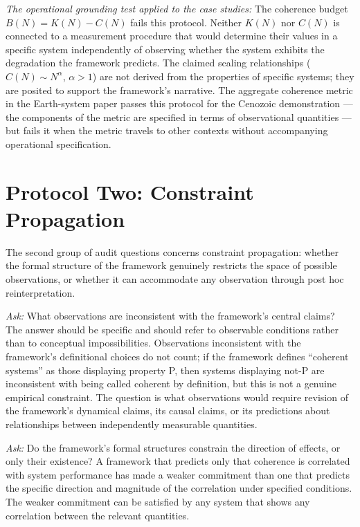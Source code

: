 \documentclass[12pt, openright, twoside]{book}
\begin{document}
\textit{The operational grounding test applied to the case studies:}
The coherence budget $B(N) = K(N) - C(N)$ fails this protocol. Neither
$K(N)$ nor $C(N)$ is connected to a measurement procedure that would
determine their values in a specific system independently of observing
whether the system exhibits the degradation the framework predicts. The
claimed scaling relationships ($C(N) \sim N^\alpha$, $\alpha > 1$) are
not derived from the properties of specific systems; they are posited to
support the framework's narrative. The aggregate coherence metric in
the Earth-system paper passes this protocol for the Cenozoic demonstration
--- the components of the metric are specified in terms of observational
quantities --- but fails it when the metric travels to other contexts
without accompanying operational specification.

\section{Protocol Two: Constraint Propagation}

The second group of audit questions concerns constraint propagation: whether
the formal structure of the framework genuinely restricts the space of
possible observations, or whether it can accommodate any observation through
post hoc reinterpretation.

\textit{Ask:} What observations are inconsistent with the framework's central
claims? The answer should be specific and should refer to observable conditions
rather than to conceptual impossibilities. Observations inconsistent with
the framework's definitional choices do not count; if the framework defines
``coherent systems'' as those displaying property P, then systems displaying
not-P are inconsistent with being called coherent by definition, but this
is not a genuine empirical constraint. The question is what observations
would require revision of the framework's dynamical claims, its causal
claims, or its predictions about relationships between independently
measurable quantities.

\textit{Ask:} Do the framework's formal structures constrain the direction
of effects, or only their existence? A framework that predicts only that
coherence is correlated with system performance has made a weaker commitment
than one that predicts the specific direction and magnitude of the correlation
under specified conditions. The weaker commitment can be satisfied by
any system that shows any correlation between the relevant quantities.
\end{document}
